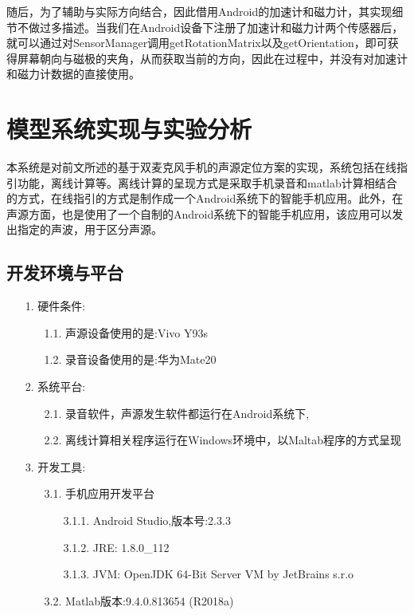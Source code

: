 \documentclass[winfonts,oneside]{njuthesis}
\begin{document}
			随后，为了辅助与实际方向结合，因此借用Android的加速计和磁力计，其实现细节不做过多描述。当我们在Android设备下注册了加速计和磁力计两个传感器后，就可以通过对SensorManager调用getRotationMatrix以及getOrientation，即可获得屏幕朝向与磁极的夹角，从而获取当前的方向，因此在过程中，并没有对加速计和磁力计数据的直接使用。
			
	
\chapter{模型系统实现与实验分析}
	
	本系统是对前文所述的基于双麦克风手机的声源定位方案的实现，系统包括在线指引功能，离线计算等。离线计算的呈现方式是采取手机录音和matlab计算相结合的方式，在线指引的方式是制作成一个Android系统下的智能手机应用。此外，在声源方面，也是使用了一个自制的Android系统下的智能手机应用，该应用可以发出指定的声波，用于区分声源。
	
	
	\section{开发环境与平台}
		
		\begin{enumerate}
			\item[1.] 硬件条件:
				\begin{enumerate}
					\item[1.1.] 声源设备使用的是:Vivo Y93s
					\item[1.2.] 录音设备使用的是:华为Mate20
				\end{enumerate}
			\item[2.] 系统平台:
				\begin{enumerate}
					\item[2.1.] 录音软件，声源发生软件都运行在Android系统下,
					\item[2.2.] 离线计算相关程序运行在Windows环境中，以Maltab程序的方式呈现	
				\end{enumerate}
			\item[3.] 开发工具:
				\begin{enumerate}
					\item[3.1.] 手机应用开发平台
						\begin{enumerate}
							\item[3.1.1.] Android Studio,版本号:2.3.3
							\item[3.1.2.] JRE: 1.8.0\_112
							\item[3.1.3.] JVM: OpenJDK 64-Bit Server VM by JetBrains s.r.o		
						\end{enumerate}			
					\item[3.2.] Matlab版本:9.4.0.813654 (R2018a)
				\end{enumerate}	
		\end{enumerate}
	
\end{document}
